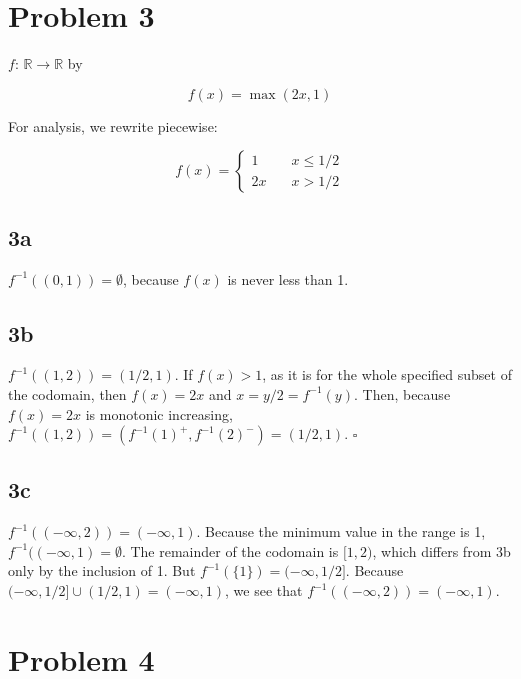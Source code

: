 \documentclass{article}
\begin{document}
\section*{Problem 3}

$f$: $\mathbb{R} \rightarrow \mathbb{R}$ by 

\begin{equation*}
  f(x) = \max(2x, 1)
\end{equation*}

For analysis, we rewrite piecewise: 

\begin{equation*}
  f(x) = \left\{
    \begin{array}{ll}
      1 &\quad x \le 1/2 \\
    2x &\quad x > 1/2
    \end{array}
    \right.
  \end{equation*}

  \subsection*{3a}

  $f^{-1}((0, 1)) = \emptyset$, because $f(x)$ is never less than 1. 

  \subsection*{3b}

$f^{-1}((1, 2)) = (1/2, 1)$. If $f(x) > 1$, as it is for the whole specified subset of the codomain, then $f(x) = 2x$ and $x = y / 2 = f^{-1}(y)$. 
Then, because $f(x) = 2x$ is monotonic increasing, $f^{-1}( (1, 2)) = (f^{-1}(1)^+, f^{-1}(2)^-) = (1/2, 1)$. $\square$ 

  \subsection*{3c}

$f^{-1}((-\infty, 2)) = (-\infty, 1)$. Because the minimum value in the range is 1, $f^{-1}((-\infty, 1) = \emptyset$. 
The remainder of the codomain is $[1, 2)$, which differs from 3b only by the inclusion of 1. But $f^{-1}(\{1\}) = (-\infty, 1/2]$.
Because $(-\infty, 1/2] \cup (1/2, 1) = (-\infty, 1)$, we see that $f^{-1}((-\infty, 2)) = (-\infty, 1)$.

\section*{Problem 4}
\end{document}
